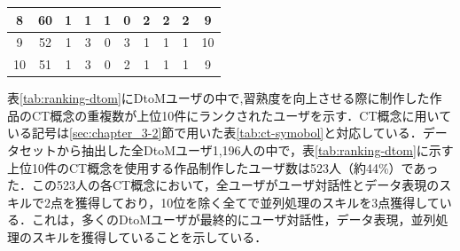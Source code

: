 \documentclass[11pt,dvipdfmx]{jreport}
\begin{document}
\begin{table}[]
\begin{tabular}{c|c|cccccccc}
8                   & 60                   & \multicolumn{1}{c|}{1} & \multicolumn{1}{c|}{1} & \multicolumn{1}{c|}{1} & \multicolumn{1}{c|}{0} & \multicolumn{1}{c|}{2} & \multicolumn{1}{c|}{2} & \multicolumn{1}{c|}{2} & 9  \\ \hline
9                   & 52                   & \multicolumn{1}{c|}{1} & \multicolumn{1}{c|}{3} & \multicolumn{1}{c|}{0} & \multicolumn{1}{c|}{3} & \multicolumn{1}{c|}{1} & \multicolumn{1}{c|}{1} & \multicolumn{1}{c|}{1} & 10 \\ \hline
10                  & 51                   & \multicolumn{1}{c|}{1} & \multicolumn{1}{c|}{3} & \multicolumn{1}{c|}{0} & \multicolumn{1}{c|}{2} & \multicolumn{1}{c|}{1} & \multicolumn{1}{c|}{1} & \multicolumn{1}{c|}{1} & 9 \\ \hline
\end{tabular}
\end{table}

表\ref{tab:ranking-dtom}にDtoMユーザの中で,習熟度を向上させる際に制作した作品のCT概念の重複数が上位10件にランクされたユーザを示す．CT概念に用いている記号は\ref{sec:chapter_3-2}節で用いた表\ref{tab:ct-symobol}と対応している．データセットから抽出した全DtoMユーザ1,196人の中で，表\ref{tab:ranking-dtom}に示す上位10件のCT概念を使用する作品制作したユーザ数は523人（約44\%）であった．この523人の各CT概念において，全ユーザがユーザ対話性とデータ表現のスキルで2点を獲得しており，10位を除く全てで並列処理のスキルを3点獲得している．これは，多くのDtoMユーザが最終的にユーザ対話性，データ表現，並列処理のスキルを獲得していることを示している．
\end{document}
